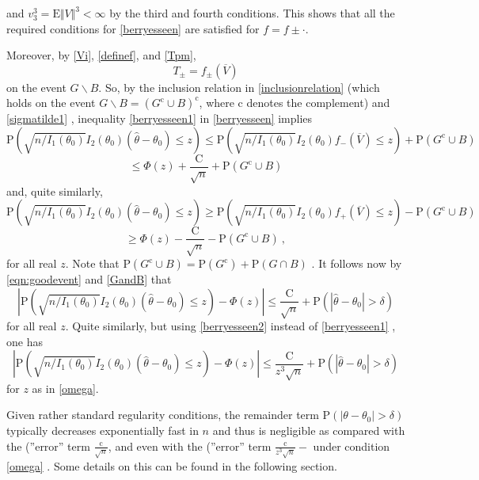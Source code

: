 and $ v_{3}^{3}=\mathrm{E}\Vert V\Vert^{3}<\infty$ by the third and fourth conditions. This shows that all the required conditions for \eqref{berryesseen} are satisfied for $ f=f\pm\cdot$.

Moreover, by \eqref{Vi}, \eqref{definef}, and \eqref{Tpm},
$$
T_{\pm}=f_{\pm}(\overline{V})
$$
on the event $G\backslash B$. So, by the inclusion relation in \eqref{inclusionrelation} (which holds on the event $G\backslash B=(G^{\mathrm{c}}\cup B)^{\mathrm{c}}$, where $\mathrm{c}$ denotes the complement) and \eqref{sigmatilde1} , inequality \eqref{berryesseen1} in \ref{berryesseen} implies
$$
\mathrm{P}(\sqrt{n/I_1(\theta_{0})}I_2(\theta_0)(\hat{\theta}-\theta_{0})\leq z)\leq \mathrm{P}(\sqrt{n/I_1(\theta_{0})}I_2(\theta_0)f_{-}(\overline{V})\leq z)+\mathrm{P}(G^{\mathrm{c}}\cup B)
$$
$$
\leq\Phi(z)+\frac{\mathrm{C}}{\sqrt{n}}+\mathrm{P}(G^{\mathrm{c}}\cup B)
$$
and, quite similarly,
$$
\mathrm{P}(\sqrt{n/I_1(\theta_{0})}I_2(\theta_0)(\hat{\theta}-\theta_{0})\leq z)\geq \mathrm{P}(\sqrt{n/I_1(\theta_{0})}I_2(\theta_0)f_{+}(\overline{V})\leq z)-\mathrm{P}(G^{\mathrm{c}}\cup B)
$$
$$
\geq\Phi(z)-\frac{\mathrm{C}}{\sqrt{n}}-\mathrm{P}(G^{\mathrm{c}}\cup B)\ ,
$$
for all real $z$. Note that $\mathrm{P}(G^{\mathrm{c}}\cup B)=\mathrm{P}(G^{\mathrm{c}})+\mathrm{P}(G\cap B)$ . It follows now by \eqref{eqn:goodevent} and \eqref{GandB} that
\begin{equation}
	|\displaystyle \mathrm{P}(\sqrt{n/I_1(\theta_{0})}I_2(\theta_0)(\hat{\theta}-\theta_{0})\leq z)-\Phi(z)|\leq\frac{\mathrm{C}}{\sqrt{n}}+\mathrm{P}(|\hat{\theta}-\theta_{0}|>\delta)
\end{equation}
for all real $z$. Quite similarly, but using \eqref{berryesseen2} instead of \eqref{berryesseen1} , one has
\begin{equation}
	|\displaystyle \mathrm{P}(\sqrt{n/I_1(\theta_{0})}I_2(\theta_0)(\hat{\theta}-\theta_{0})\leq z)-\Phi(z)|\leq\frac{\mathrm{C}}{z^{3}\sqrt{n}}+\mathrm{P}(|\hat{\theta}-\theta_{0}|>\delta)
\end{equation}
for $z$ as in \eqref{omega}.

 Given rather standard regularity conditions, the remainder term $\mathrm{P}(|\theta-\theta_{0}|>\delta)$ typically decreases exponentially fast in $n$ and thus is negligible as compared with the (''error'' term $\displaystyle \frac{\mathrm{c}}{\sqrt{n}}$, and even with the (''error'' term $\displaystyle \frac{\mathrm{c}}{z^{3}\sqrt{n}}-$ under condition \eqref{omega} . Some details on this can be found in the following section.

